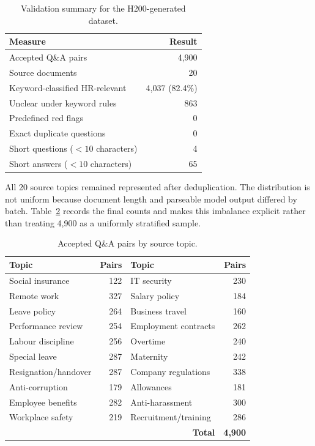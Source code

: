 \documentclass[12pt,a4paper,oneside]{report}
\begin{document}
\begin{table}[H]
\centering
\caption{Validation summary for the H200-generated dataset.}
\label{tab:data-validation}
\begin{tabular}{@{}lr@{}}
\toprule
\textbf{Measure} & \textbf{Result} \\
\midrule
Accepted Q\&A pairs & 4,900 \\
Source documents & 20 \\
Keyword-classified HR-relevant & 4,037 (82.4\%) \\
Unclear under keyword rules & 863 \\
Predefined red flags & 0 \\
Exact duplicate questions & 0 \\
Short questions ($<10$ characters) & 4 \\
Short answers ($<10$ characters) & 65 \\
\bottomrule
\end{tabular}
\end{table}

All 20 source topics remained represented after deduplication. The distribution
is not uniform because document length and parseable model output differed by
batch. Table~\ref{tab:topic-distribution} records the final counts and makes this
imbalance explicit rather than treating 4,900 as a uniformly stratified sample.

\begin{table}[H]
\centering
\caption{Accepted Q\&A pairs by source topic.}
\label{tab:topic-distribution}
\small
\begin{tabular}{@{}lrlr@{}}
\toprule
\textbf{Topic} & \textbf{Pairs} & \textbf{Topic} & \textbf{Pairs} \\
\midrule
Social insurance & 122 & IT security & 230 \\
Remote work & 327 & Salary policy & 184 \\
Leave policy & 264 & Business travel & 160 \\
Performance review & 254 & Employment contracts & 262 \\
Labour discipline & 256 & Overtime & 240 \\
Special leave & 287 & Maternity & 242 \\
Resignation/handover & 287 & Company regulations & 338 \\
Anti-corruption & 179 & Allowances & 181 \\
Employee benefits & 282 & Anti-harassment & 300 \\
Workplace safety & 219 & Recruitment/training & 286 \\
\midrule
\multicolumn{3}{r}{\textbf{Total}} & \textbf{4,900} \\
\bottomrule
\end{tabular}
\end{table}
\end{document}
